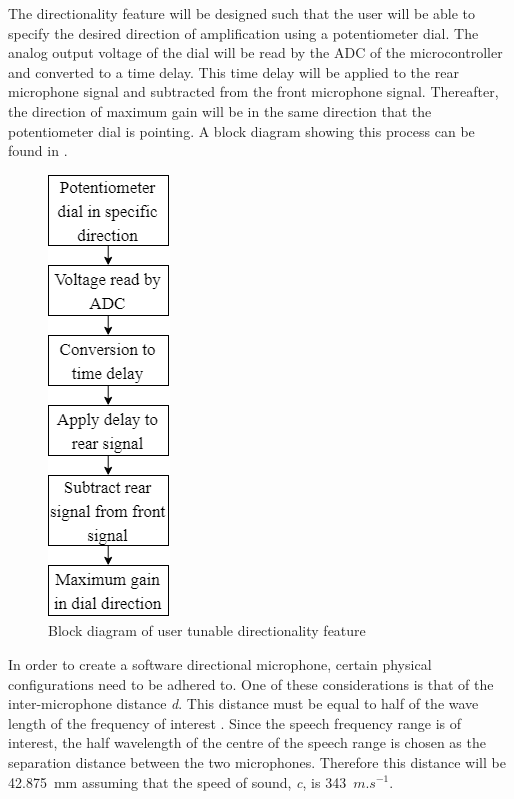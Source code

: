 \documentclass[10pt,twocolumn]{witseiepaper}
\begin{document}
The directionality feature will be designed such that the user will be able to specify the desired direction of amplification using a potentiometer dial. The analog output voltage of the dial will be read by the ADC of the microcontroller and converted to a time delay. This time delay will be applied to the rear microphone signal and subtracted from the front microphone signal. Thereafter, the direction of maximum gain will be in the same direction that the potentiometer dial is pointing. A block diagram showing this process can be found in .

\begin{figure}[h]
	\centering
	\includegraphics[width=0.3\columnwidth]{directionalityBlockDiagram.png}
	\caption{Block diagram of user tunable directionality feature}
	\raggedright
	\label{fig:directionalityBlockDiagram}	
\end{figure}

In order to create a software directional microphone, certain physical configurations need to be adhered to. One of these considerations is that of the inter-microphone distance \textit{d}. This distance must be equal to half of the wave length of the frequency of interest \cite{Distortion_of_interaural_time_cues}. Since the speech frequency range is of interest, the half wavelength of the centre of the speech range is chosen as the separation distance between the two microphones. Therefore this distance will be 42.875~mm assuming that the speed of sound, \textit{c}, is 343~$m.s^{-1}$.
\end{document}
